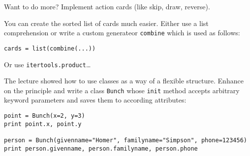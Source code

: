 \begin{aufgabe}[UNO]
\begin{teilaufgabe}
Want to do more? Implement action cards (like skip, draw, reverse).
\end{teilaufgabe}
\begin{teilaufgabe}
You can create the sorted list of cards much easier. Either use a list comprehension or write a custom generateor \lstinline{combine} which is used as follows:
\begin{lstlisting}
cards = list(combine(...))
\end{lstlisting}
Or use \lstinline{itertools.product}\dots
\end{teilaufgabe}
\end{aufgabe}

\begin{aufgabe}
The lecture showed how to use classes as a way of a flexible structure. Enhance on the principle and write a class \lstinline{Bunch} whose \lstinline{init} method accepts arbitrary keyword parameters and saves them to according attributes:
\begin{lstlisting}
point = Bunch(x=2, y=3)
print point.x, point.y

person = Bunch(givenname="Homer", familyname="Simpson", phone=123456)
print person.givenname, person.familyname, person.phone
\end{lstlisting}
\end{aufgabe}


